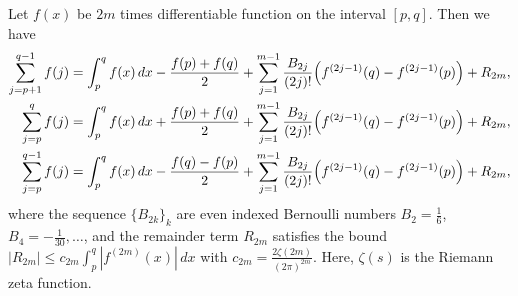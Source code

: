 \documentclass[10pt,a4paper]{amsart}
\begin{document}
\begin{lemma}\label{lemma:Euler-Maclaurin}
Let $f(x)$ be $2m$ times differentiable function on the interval $[p,q]$. Then we have 
\begin{align}
\begin{split}
\sum_{j=p+1}^{q-1}f(j)&=\int_{p}^{q}f(x)\,dx-\frac{f(p)+f(q)}{2}+\sum_{j=1}^{m-1}\frac{B_{2j}}{(2j)!}\Bigl( 
f^{(2j-1)}(q)-f^{(2j-1)}(p)
\Bigr)
+R_{2m}, 
\\
\sum_{j=p}^{q}f(j)&=\int_{p}^{q}f(x)\,dx+\frac{f(p)+f(q)}{2}+\sum_{j=1}^{m-1}\frac{B_{2j}}{(2j)!}\Bigl( 
f^{(2j-1)}(q)-f^{(2j-1)}(p)
\Bigr)
+R_{2m},
\\
\sum_{j=p}^{q-1}f(j)
&=\int_{p}^{q}f(x)\,dx-\frac{f(q)-f(p)}{2}+\sum_{j=1}^{m-1}\frac{B_{2j}}{(2j)!}\Bigl(f^{(2j-1)}(q)-f^{(2j-1)}(p)\Bigr)+R_{2m}, 
\end{split}    
\end{align}
where the sequence $\{B_{2k}\}_k$ are even indexed Bernoulli numbers $B_{2}=\frac{1}{6}$, $B_4=-\frac{1}{30},\dots$, and the remainder term $R_{2m}$ satisfies the bound $|R_{2m}|\leq c_{2m}\int_{p}^{q}|f^{(2m)}(x)|\,dx$ with $c_{2m}=\frac{2\zeta(2m)}{(2\pi)^{2m}}$. 
Here, $\zeta(s)$ is the Riemann zeta function. 
\end{lemma}
\end{document}
